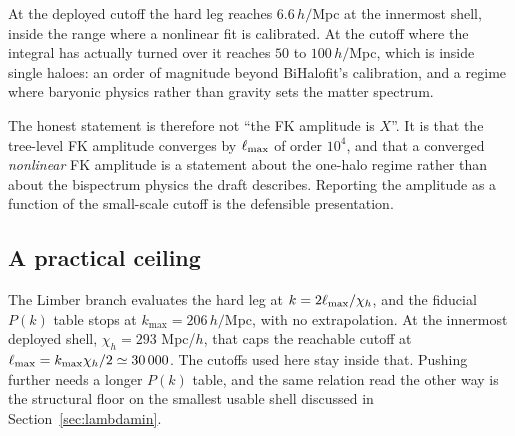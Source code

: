 At the deployed cutoff the hard leg reaches $6.6\,h/$Mpc at the innermost
shell, inside the range where a nonlinear fit is calibrated. At the cutoff
where the integral has actually turned over it reaches $50$ to
$100\,h/$Mpc, which is inside single haloes: an order of magnitude beyond
BiHalofit's calibration, and a regime where baryonic physics rather than
gravity sets the matter spectrum.

The honest statement is therefore not ``the FK amplitude is $X$''. It is
that the tree-level FK amplitude converges by $\ell_{\max}$ of order $10^4$, and
that a converged \emph{nonlinear} FK amplitude is a statement about the
one-halo regime rather than about the bispectrum physics the draft
describes. Reporting the amplitude as a function of the small-scale cutoff
is the defensible presentation.

\subsection{A practical ceiling}

The Limber branch evaluates the hard leg at $k=2\ell_{\max}/\chi_h$, and the
fiducial $P(k)$ table stops at $k_{\max}=206\,h/$Mpc, with no
extrapolation. At the innermost deployed shell, $\chi_h=293$ Mpc/$h$, that
caps the reachable cutoff at $\ell_{\max}=k_{\max}\chi_h/2\simeq30\,000$. The
cutoffs used here stay inside that. Pushing further needs a longer $P(k)$
table, and the same relation read the other way is the structural floor on
the smallest usable shell discussed in Section~\ref{sec:lambdamin}.
